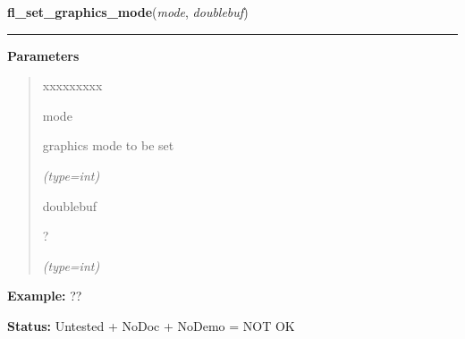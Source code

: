 \hspace{.8\funcindent}\begin{boxedminipage}{\funcwidth}

    \raggedright \textbf{fl\_set\_graphics\_mode}(\textit{mode}, \textit{doublebuf})

    \vspace{-1.5ex}

    \rule{\textwidth}{0.5\fboxrule}
\setlength{\parskip}{2ex}
\setlength{\parskip}{1ex}
      \textbf{Parameters}
      \vspace{-1ex}

      \begin{quote}
        \begin{Ventry}{xxxxxxxxx}

          \item[mode]

          graphics mode to be set

            {\it (type=int)}

          \item[doublebuf]

          ?

            {\it (type=int)}

        \end{Ventry}

      \end{quote}

\textbf{Example:} ??



\textbf{Status:} Untested + NoDoc + NoDemo = NOT OK



    \end{boxedminipage}

    \label{xformslib:flxbasic:fl_set_visualID}

    \vspace{0.5ex}

